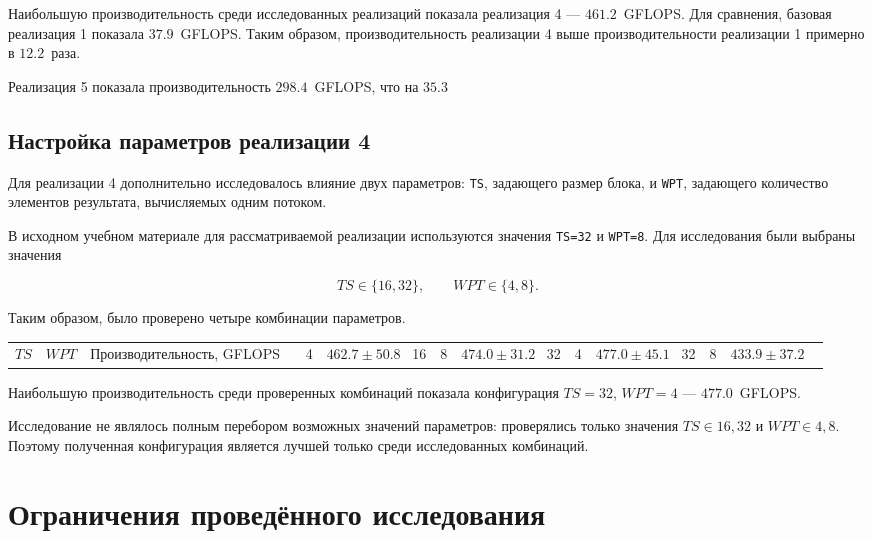 \documentclass[a4paper]{article}
\begin{document}
Наибольшую производительность среди исследованных реализаций показала реализация 4 --- $461.2$~GFLOPS. Для сравнения, базовая реализация 1 показала $37.9$~GFLOPS. Таким образом, производительность реализации 4 выше производительности реализации 1 примерно в $12.2$~раза.

Реализация 5 показала производительность $298.4$~GFLOPS, что на $35.3$~%

\subsection{Настройка параметров реализации 4}

Для реализации 4 дополнительно исследовалось влияние двух параметров: \texttt{TS}, задающего размер блока, и \texttt{WPT}, задающего количество элементов результата, вычисляемых одним потоком.

В исходном учебном материале для рассматриваемой реализации используются значения \texttt{TS=32} и \texttt{WPT=8}. Для исследования были выбраны значения

$$
TS \in \{16,32\},
\qquad
WPT \in \{4,8\}.
$$

Таким образом, было проверено четыре комбинации параметров.

\begin{center}
\begin{tabular}{c c r}
\toprule
$TS$ & $WPT$ & Производительность, GFLOPS \
 & 4 & $462.7 \pm 50.8$ \
16 & 8 & $474.0 \pm 31.2$ \
32 & 4 & $477.0 \pm 45.1$ \
32 & 8 & $433.9 \pm 37.2$ \
\bottomrule
\end{tabular}
\end{center}

Наибольшую производительность среди проверенных комбинаций показала конфигурация $TS=32$, $WPT=4$ --- $477.0$~GFLOPS.

Исследование не являлось полным перебором возможных значений параметров: проверялись только значения $TS \in {16,32}$ и $WPT \in {4,8}$. Поэтому полученная конфигурация является лучшей только среди исследованных комбинаций.

\section{Ограничения проведённого исследования}
\end{document}
